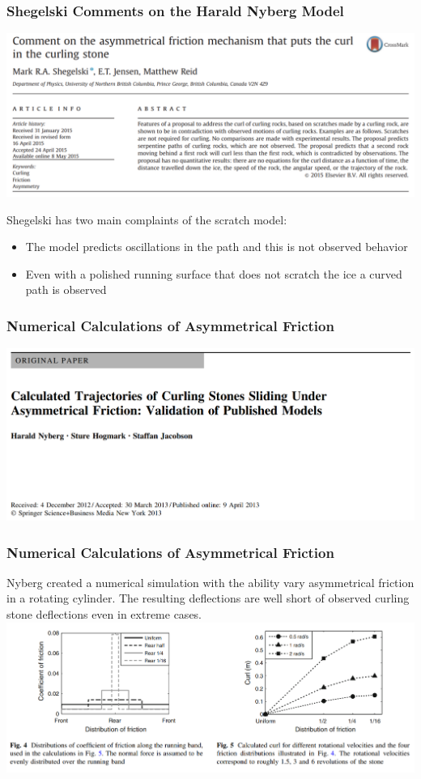 \documentclass{beamer}
\begin{document}
\begin{frame}\frametitle{Shegelski Comments on the Harald Nyberg Model}
    \begin{center}
    \includegraphics[width=1.0\textwidth]{Images/Nyberg_Comment.png}
    \end{center}
    Shegelski has two main complaints of the scratch model:
    \begin{itemize}
        \item The model predicts oscillations in the path and this is not observed behavior
        \item Even with a polished running surface that does not scratch the ice a curved path is observed
    \end{itemize}
\end{frame}

\begin{frame}\frametitle{Numerical Calculations of Asymmetrical Friction}
    \centering
    \includegraphics[width=1.0\textwidth]{Images/Nyberg_Title_2013.png}
\end{frame}

\begin{frame}\frametitle{Numerical Calculations of Asymmetrical Friction}
    Nyberg created a numerical simulation with the ability vary asymmetrical friction in a rotating cylinder. The resulting deflections are well short of observed curling stone deflections even in extreme cases.
    \centering
    \includegraphics[width=1.0\textwidth]{Images/Numerical_Fric.png}
\end{frame}
\end{document}
